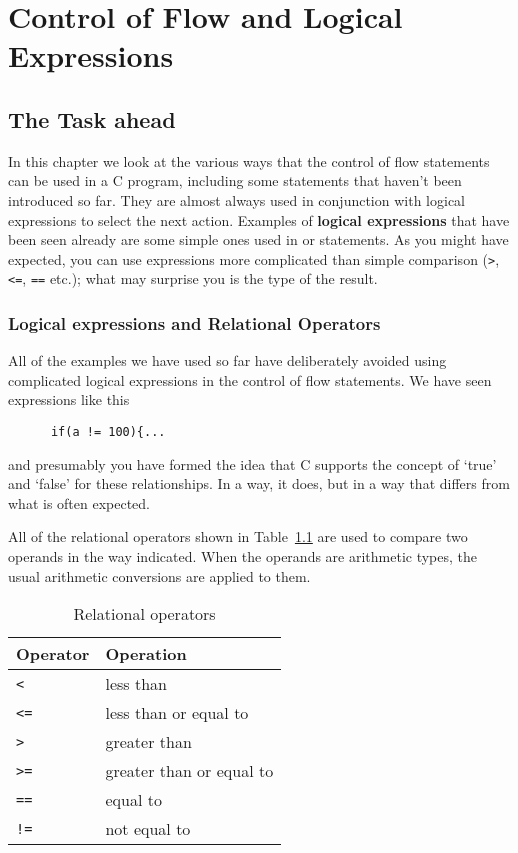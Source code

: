  \chapter{Control of Flow and Logical Expressions}\label{chap:cntrlFlow}


        \section{The Task ahead}
        

  

  In this chapter we look at the various ways that the control of flow
   statements can be used in a C program, including some statements that
   haven't been introduced so far. They are almost always used in conjunction
   with logical expressions to select the next action. Examples of
   \textbf{logical expressions} that have been seen already are some simple
   ones used in \kif{} or \while{} statements. As you might
   have expected, you can use expressions more complicated than simple
   comparison (\texttt{>}, \texttt{<=}, \texttt{==} etc.);
   what may surprise you is the type of the result.


  \subsection{Logical expressions and Relational Operators}
   

   All of the examples we have used so far have deliberately avoided using
    complicated logical expressions in the control of flow statements. We have
    seen expressions like this


    \begin{Verbatim}
      if(a != 100){...
      \end{Verbatim}

   and presumably you have formed the idea that C supports the concept
    of `true' and `false' for these relationships. In a way, it
    does, but in a way that differs from what is often expected.


   All of the relational operators shown in Table~\ref{tabrelOp} are used
    to compare two operands in the way indicated. When the operands are
    arithmetic types, the usual arithmetic conversions are applied to
    them.


    \begin{table}[htb]
      \centering
      \begin{tabular}{ll}
        \toprule
        Operator    & Operation    \\
        \midrule
        \texttt{<}  & less than    \\
        \texttt{<=} & less than or equal to    \\
        \texttt{>}  & greater than    \\
        \texttt{>=} & greater than or equal to    \\
        \texttt{==} & equal to    \\
        \texttt{!=} & not equal to    \\
        \bottomrule
      \end{tabular}
      \caption{\label{tabrelOp}Relational operators}
    \end{table}


